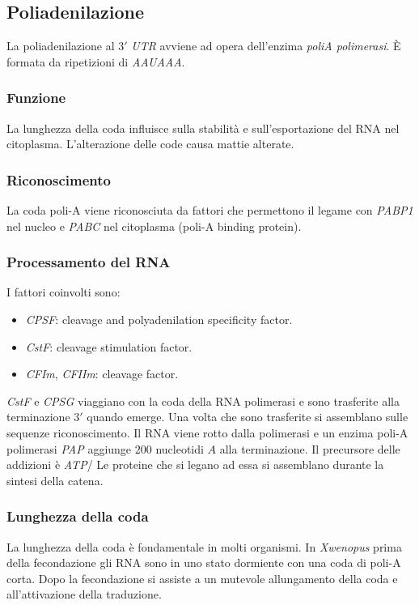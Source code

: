 	\subsection{Poliadenilazione}
	La poliadenilazione al $3'$ \emph{UTR} avviene ad opera dell'enzima \emph{poliA polimerasi}.
	\`E formata da ripetizioni di \emph{AAUAAA}.

		\subsubsection{Funzione}
		La lunghezza della coda influisce sulla stabilit\`a e sull'esportazione del RNA nel citoplasma.
		L'alterazione delle code causa mattie alterate.

		\subsubsection{Riconoscimento}
		La coda poli-A viene riconosciuta da fattori che permettono il legame con \emph{PABP1} nel nucleo e \emph{PABC} nel citoplasma (poli-A binding protein).

		\subsubsection{Processamento del RNA}
		I fattori coinvolti sono:
		\begin{multicols}{2}
			\begin{itemize}
				\item \emph{CPSF}: cleavage and polyadenilation specificity factor.
				\item \emph{CstF}: cleavage stimulation factor.
				\item \emph{CFIm}, \emph{CFIIm}: cleavage factor.
			\end{itemize}
		\end{multicols}
		\emph{CstF} e \emph{CPSG} viaggiano con la coda della RNA polimerasi e sono trasferite alla terminazione $3'$ quando emerge.
		Una volta che sono trasferite si assemblano sulle sequenze riconoscimento.
		Il RNA viene rotto dalla polimerasi e un enzima poli-A polimerasi \emph{PAP} aggiunge $200$ nucleotidi $A$ alla terminazione.
		Il precursore delle addizioni \`e \emph{ATP}/
		Le proteine che si legano ad essa si assemblano durante la sintesi della catena.


		\subsubsection{Lunghezza della coda}
		La lunghezza della coda \`e fondamentale in molti organismi.
		In \emph{Xwenopus} prima della fecondazione gli RNA sono in uno stato dormiente con una coda di poli-A corta.
		Dopo la fecondazione si assiste a un mutevole allungamento della coda e all'attivazione della traduzione.

